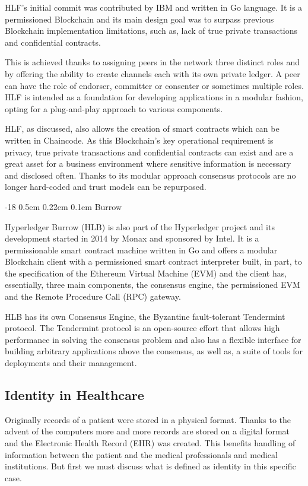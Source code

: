 \documentclass[]{llncs}
\makeatletter
\renewcommand\subsubsection{\@startsection{subsubsection}{3}{\z@}%
                       {-18\p@ \@plus -4\p@ \@minus -4\p@}%
                       {0.5em \@plus 0.22em \@minus 0.1em}%
                       {\normalfont\normalsize\bfseries\boldmath}}
\makeatother
\begin{document}
HLF’s initial commit was contributed by IBM and written in Go language. 
It is a permissioned Blockchain and its main design goal was to surpass previous 
Blockchain implementation limitations, such as, lack of true private transactions 
and confidential contracts.

This is achieved thanks to assigning peers in the network three distinct roles 
and by offering the ability to create channels each with its own private ledger.
A peer can have the role of endorser, committer or consenter or sometimes multiple roles. 
HLF is intended as a foundation for developing applications in a modular fashion, 
opting for a plug-and-play approach to various components. \cite{HyperledgerFabricDocs2017}

HLF, as discussed, also allows the creation of smart contracts which can be written in Chaincode. 
As this Blockchain's key operational requirement is privacy, true private transactions 
and confidential contracts can exist and are a great asset for a business environment 
where sensitive information is necessary and disclosed often. 
Thanks to its modular approach consensus protocols are no longer hard-coded and 
trust models can be repurposed.

\subsubsection{Burrow}

Hyperledger Burrow (HLB) is also part of the Hyperledger project and its development 
started in 2014 by Monax and sponsored by Intel. It is a permissionable smart contract machine 
written in Go and offers a modular Blockchain client with a permissioned smart contract interpreter 
built, in part, to the specification of the Ethereum Virtual Machine (EVM) and the client has, 
essentially, three main components, the consensus engine, the permissioned EVM and the 
Remote Procedure Call (RPC) gateway.
\cite{Kuhlman2017,HyperledgerBurrow2017}

HLB has its own Consensus Engine, the Byzantine fault-tolerant Tendermint protocol. 
The Tendermint protocol is an open-source effort that allows high performance in 
solving the consensus problem and also has a flexible interface for building 
arbitrary applications above the consensus, as well as, a suite of tools for 
deployments and their management. \cite{Buchman2016}
%

\subsection{Identity in Healthcare}
Originally records of a patient were stored in a physical format. 
Thanks to the advent of the computers more and more records are stored on a 
digital format and the Electronic Health Record (EHR) was created. 
This benefits handling of information between the patient 
and the medical professionals and medical institutions. But first we 
must discuss what is defined as identity in this specific case.
\end{document}
